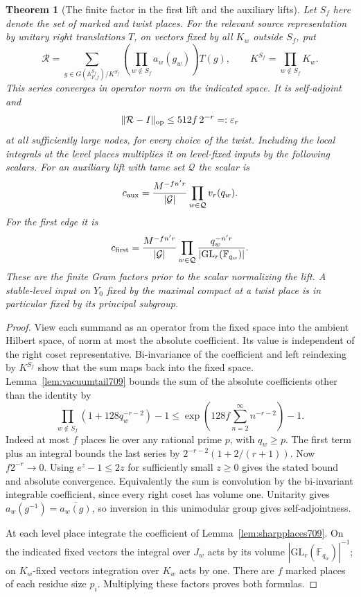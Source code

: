 \documentclass[a4paper,11pt]{article}
\newtheorem{theorem}[proposition]{Theorem}
\theoremstyle{definition}
\theoremstyle{remark}
\numberwithin{equation}{section}
\begin{document}
\begin{theorem}[The finite factor in the first lift and the auxiliary lifts]\leavevmode
\label{thm:finitegram709}
Let \(S_f\) here denote the set of marked and twist places.
For the relevant source representation by unitary right
translations \(T\), on vectors fixed by all \(K_w\) outside
\(S_f\), put
\[
  \mathcal R=\sum_{g\in G(\mathbb A_{F,f}^{S_f})/K^{S_f}}
           \left(\prod_{w\notin S_f}a_w(g_w)\right)T(g),
      \qquad K^{S_f}=\prod_{w\notin S_f}K_w .
\]
This series converges in operator norm on the indicated
space. It is self-adjoint and
\[
              \|\mathcal R-I\|_{\rm op}\le512f\,2^{-r}
                         =:\varepsilon_r
\]
at all sufficiently large nodes, for every choice of the
twist. Including the local integrals at the level places
multiplies it on level-fixed inputs by the following scalars.
For an auxiliary lift with tame set \(\mathcal Q\) the scalar is
\[
       c_{\rm aux}=\frac{M^{-fn'r}}{|\mathcal G|}
                         \prod_{w\in\mathcal Q}v_r(q_w).
\]
For the first edge it is
\[
       c_{\rm first}=
       \frac{M^{-fn'r}}{|\mathcal G|}
           \prod_{w\in\mathcal Q}
                \frac{q_w^{-n'r}}{|\mathrm{GL}_r(\mathbb F_{q_w})|}.
\]
These are the finite Gram factors prior to the scalar
normalizing the lift. A stable-level input on \(Y_0\) fixed
by the maximal compact at a twist place is in particular
fixed by its principal subgroup.
\end{theorem}
\begin{proof}
View each summand as an operator from the fixed space into
the ambient Hilbert space, of norm at most the absolute
coefficient. Its value is independent of the right coset
representative. Bi-invariance of the coefficient and left
reindexing by \(K^{S_f}\) show that the sum maps back into
the fixed space. Lemma~\ref{lem:vacuumtail709} bounds the
sum of the absolute coefficients other than the identity by
\[
       \prod_{w\notin S_f}(1+128q_w^{-r-2})-1
       \le \exp\!\left(128 f\sum_{n=2}^{\infty}n^{-r-2}\right)-1 .
\]
Indeed at most \(f\) places lie over any rational prime \(p\),
with \(q_w\ge p\). The first term plus an integral bounds the
last series by \(2^{-r-2}(1+2/(r+1))\). Now \(f2^{-r}\to0\).
Using \(e^z-1\le2z\) for sufficiently small \(z\ge0\)
gives the stated bound and absolute convergence. Equivalently
the sum is convolution by the bi-invariant integrable
coefficient, since every right coset has volume one.
Unitarity gives \(a_w(g^{-1})=\overline{a_w(g)}\), so inversion
in this unimodular group gives self-adjointness.

At each level place integrate the coefficient of
Lemma~\ref{lem:sharpplaces709}. On the indicated fixed vectors
the integral over \(J_w\) acts by its volume
\(|\mathrm{GL}_r(\mathbb F_{q_w})|^{-1}\); on \(K_w\)-fixed
vectors integration over \(K_w\) acts by one. There are
\(f\) marked places of each residue size \(p_i\). Multiplying
these factors proves both formulas.
\end{proof}
\end{document}
